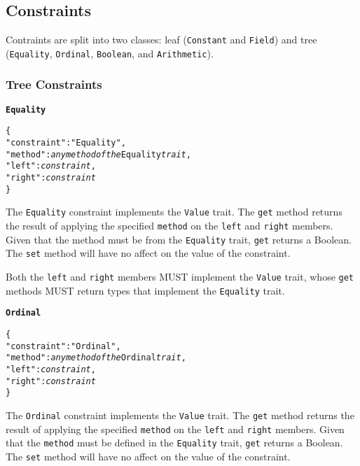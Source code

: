\documentclass[10pt,twocolumn,a4paper]{article}
\newcommand{\code}[1]{\texttt{#1}}
\begin{document}
\subsection{Constraints}
\label{sec:constraints}

Contraints are split into two classes: leaf (\texttt{Constant} and \texttt{Field}) and
tree (\texttt{Equality}, \texttt{Ordinal}, \texttt{Boolean}, and \texttt{Arithmetic}). 

\subsubsection{Tree Constraints}

\textbf{\texttt{Equality}}

\footnotesize
\begin{alltt}
  \{
    "constraint"   : "Equality",
    "method"       : \emph{any method of the} Equality \emph{trait},
    "left"         : \emph{constraint},
    "right"        : \emph{constraint}
  \}
\end{alltt}
\normalsize

The \code{Equality} constraint implements the \code{Value} trait. The \code{get} method
returns the result of applying the specified \code{method} on the \code{left} and
\code{right} members. Given that the method must be from the \code{Equality} trait,
\code{get} returns a Boolean. The \code{set} method will have no affect on the value of
the constraint.

Both the \code{left} and \code{right} members MUST implement the \code{Value} trait, whose
\code{get} methods MUST return types that implement the \code{Equality} trait.

\textbf{\texttt{Ordinal}}

\footnotesize
\begin{alltt}
  \{
    "constraint"   : "Ordinal",
    "method"       : \emph{any method of the} Ordinal \emph{trait},
    "left"         : \emph{constraint},
    "right"        : \emph{constraint}
  \}
\end{alltt}
\normalsize

The \code{Ordinal} constraint implements the \code{Value} trait. The \code{get} method
returns the result of applying the specified \code{method} on the \code{left} and
\code{right} members. Given that the \code{method} must be defined in the \code{Equality}
trait, \code{get} returns a Boolean. The \code{set} method will have no affect on the
value of the constraint.
\end{document}
